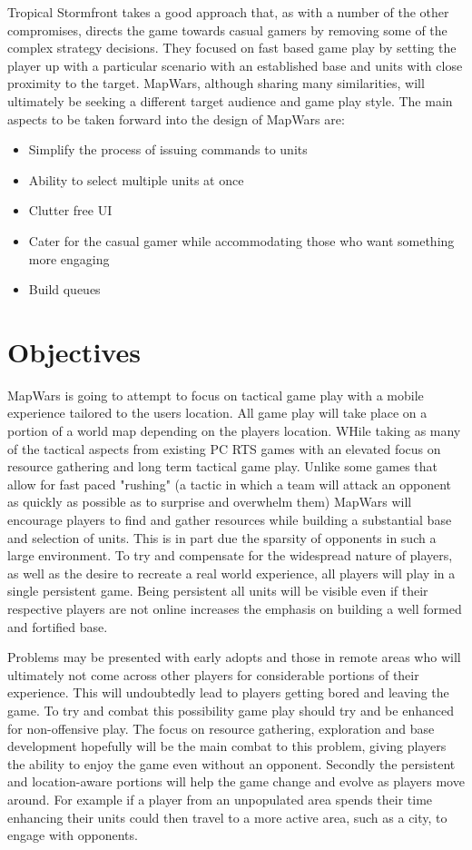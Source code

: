 Tropical Stormfront takes a good approach that, as with a number of the other compromises, directs the game towards casual gamers by removing some of the complex strategy decisions. They focused on fast based game play by setting the player up with a particular scenario with an established base and units with close proximity to the target. MapWars, although sharing many similarities, will ultimately be seeking a different target audience and game play style. The main aspects to be taken forward into the design of MapWars are:
\begin{itemize}
\item Simplify the process of issuing commands to units
\item Ability to select multiple units at once
\item Clutter free UI
\item Cater for the casual gamer while accommodating those who want something more engaging
\item Build queues
\end{itemize}


\section{Objectives}
MapWars is going to attempt to focus on tactical game play with a mobile experience tailored to the users location. All game play will take place on a portion of a world map depending on the players location. WHile taking as many of the tactical aspects from existing PC RTS games with an elevated focus on resource gathering and long term tactical game play. Unlike some games that allow for fast paced "rushing" (a tactic in which a team will attack an opponent as quickly as possible as to surprise and overwhelm them) MapWars will encourage players to find and gather resources while building a substantial base and selection of units. This is in part due the sparsity of opponents in such a large environment. To try and compensate for the widespread nature of players, as well as the desire to recreate a real world experience, all players will play in a single persistent game. Being persistent all units will be visible even if their respective players are not online increases the emphasis on building a well formed and fortified base.

Problems may be presented with early adopts and those in remote areas who will ultimately not come across other players for considerable portions of their experience. This will undoubtedly lead to players getting bored and leaving the game. To try and combat this possibility game play should try and be enhanced for non-offensive play. The focus on resource gathering, exploration and base development hopefully will be the main combat to this problem, giving players the ability to enjoy the game even without an opponent. Secondly the persistent and location-aware portions will help the game change and evolve as players move around. For example if a player from an unpopulated area spends their time enhancing their units could then travel to a more active area, such as a city, to engage with opponents.

